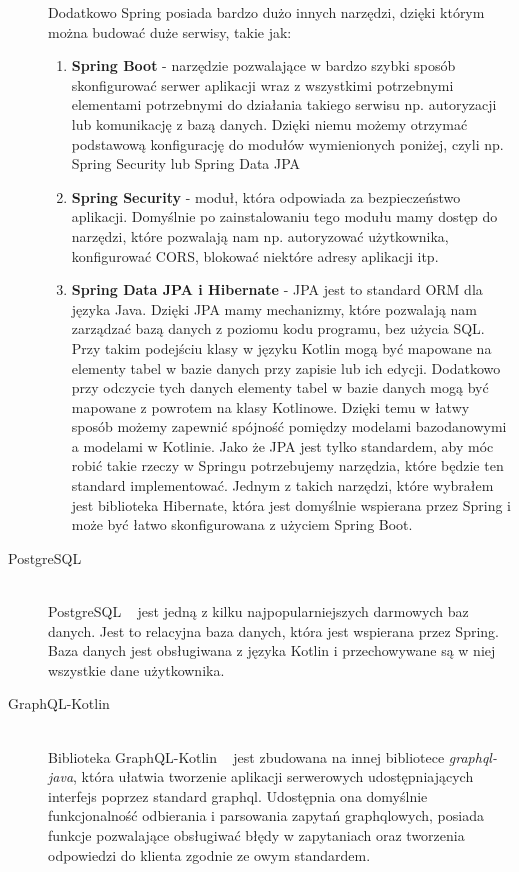 \begin{description}
    Dodatkowo Spring posiada bardzo dużo innych narzędzi, dzięki którym można budować duże serwisy, takie jak:
    \begin{enumerate}
      \item \textbf{Spring Boot} - narzędzie pozwalające w bardzo szybki sposób skonfigurować serwer aplikacji wraz z wszystkimi potrzebnymi elementami potrzebnymi do działania takiego serwisu np. autoryzacji lub komunikację z bazą danych. Dzięki niemu możemy otrzymać podstawową konfigurację do modułów wymienionych poniżej, czyli np. Spring Security lub Spring Data JPA
      \item \textbf{Spring Security} - moduł, która odpowiada za bezpieczeństwo aplikacji. Domyślnie po zainstalowaniu tego modułu mamy dostęp do narzędzi, które pozwalają nam np. autoryzować użytkownika, konfigurować CORS, blokować niektóre adresy aplikacji itp.
      \item \textbf{Spring Data JPA i Hibernate} - JPA jest to standard ORM dla języka Java. Dzięki JPA mamy mechanizmy, które pozwalają nam zarządzać bazą danych z poziomu kodu programu, bez użycia SQL. Przy takim podejściu klasy w języku Kotlin mogą być mapowane na elementy tabel w bazie danych przy zapisie lub ich edycji. Dodatkowo przy odczycie tych danych elementy tabel w bazie danych mogą być mapowane z powrotem na klasy Kotlinowe. Dzięki temu w łatwy sposób możemy zapewnić spójność pomiędzy modelami bazodanowymi a modelami w Kotlinie. Jako że JPA jest tylko standardem, aby móc robić takie rzeczy w Springu potrzebujemy narzędzia, które będzie ten standard implementować. Jednym z takich narzędzi, które wybrałem jest biblioteka Hibernate, która jest domyślnie wspierana przez Spring i może być łatwo skonfigurowana z użyciem Spring Boot.
    \end{enumerate}

  \item[PostgreSQL] \hfill \\ PostgreSQL ~\cite{ref_postgre_doc} jest jedną z kilku najpopularniejszych darmowych baz danych. Jest to relacyjna baza danych, która jest wspierana przez Spring. Baza danych jest obsługiwana z języka Kotlin i przechowywane są w niej wszystkie dane użytkownika.
  \item[GraphQL-Kotlin] \hfill \\ Biblioteka GraphQL-Kotlin ~\cite{ref_gqlKotlin_doc} jest zbudowana na innej bibliotece \emph{graphql-java}, która ułatwia tworzenie aplikacji serwerowych udostępniających interfejs poprzez standard graphql. Udostępnia ona domyślnie funkcjonalność odbierania i parsowania zapytań graphqlowych, posiada funkcje pozwalające obsługiwać błędy w zapytaniach oraz tworzenia odpowiedzi do klienta zgodnie ze owym standardem.
\end{description}



